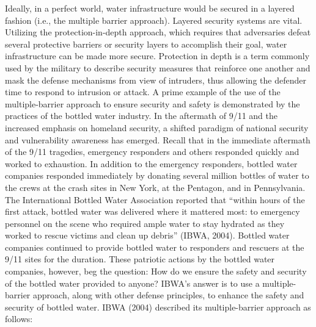 \documentclass{article}
\begin{document}
Ideally, in a perfect world, water infrastructure would be secured in a
layered fashion (i.e., the multiple barrier approach). Layered security
systems are vital. Utilizing the protection-in-depth approach, which
requires that adversaries defeat several protective barriers or security
layers to accomplish their goal, water infrastructure can be made more
secure. Protection in depth is a term commonly used by the military to
describe security measures that reinforce one another and mask the
defense mechanisms from view of intruders, thus allowing the defender
time to respond to intrusion or attack. A prime example of the use of
the multiple-barrier approach to ensure security and safety is
demonstrated by the practices of the bottled water industry. In the
aftermath of 9/11 and the increased emphasis on homeland security, a
shifted paradigm of national security and vulnerability awareness has
emerged. Recall that in the immediate aftermath of the 9/11 tragedies,
emergency responders and others responded quickly and worked to
exhaustion. In addition to the emergency responders, bottled water
companies responded immediately by donating several million bottles of
water to the crews at the crash sites in New York, at the Pentagon, and
in Pennsylvania. The International Bottled Water Association reported
that ``within hours of the first attack, bottled water was delivered
where it mattered most: to emergency personnel on the scene who required
ample water to stay hydrated as they worked to rescue victims and clean
up debris'' (IBWA, 2004). Bottled water companies continued to provide
bottled water to responders and rescuers at the 9/11 sites for the
duration. These patriotic actions by the bottled water companies,
however, beg the question: How do we ensure the safety and security of
the bottled water provided to anyone? IBWA's answer is to use a
multiple-barrier approach, along with other defense principles, to
enhance the safety and security of bottled water. IBWA (2004) described
its multiple-barrier approach as follows:
\end{document}
